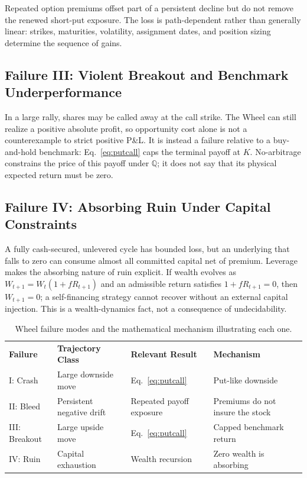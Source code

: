\documentclass[aps,pra,reprint,superscriptaddress,amsmath,amssymb,floatfix]{revtex4-2}
\theoremstyle{plain}
\theoremstyle{definition}
\theoremstyle{remark}
\begin{document}
Repeated option premiums offset part of a persistent decline but do not remove
the renewed short-put exposure. The loss is path-dependent rather than
generally linear: strikes, maturities, volatility, assignment dates, and
position sizing determine the sequence of gains.

\subsection{Failure III: Violent Breakout and Benchmark Underperformance}

In a large rally, shares may be called away at the call strike. The Wheel can
still realize a positive absolute profit, so opportunity cost alone is not a
counterexample to strict positive P\&L. It is instead a failure relative to a
buy-and-hold benchmark: Eq.~\eqref{eq:putcall} caps the terminal payoff at
\(K\). No-arbitrage constrains the price of this payoff under
\(\mathbb{Q}\); it does not say that its physical expected return must be zero.

\subsection{Failure IV: Absorbing Ruin Under Capital Constraints}

A fully cash-secured, unlevered cycle has bounded loss, but an underlying that
falls to zero can consume almost all committed capital net of premium.
Leverage makes the absorbing nature of ruin explicit. If wealth evolves as
\(W_{t+1}=W_t(1+fR_{t+1})\) and an admissible return satisfies
\(1+fR_{t+1}=0\), then \(W_{t+1}=0\); a self-financing strategy cannot recover
without an external capital injection. This is a wealth-dynamics fact, not a
consequence of undecidability.

\begin{table}[ht]
\caption{\label{tab:failuremodes}Wheel failure modes and the mathematical mechanism illustrating each one.}
\begin{ruledtabular}
\begin{tabular*}{\textwidth}{@{\extracolsep{\fill}}llll}
\textbf{Failure} & \textbf{Trajectory Class} & \textbf{Relevant Result} & \textbf{Mechanism} \\
\colrule
I: Crash & Large downside move & Eq.~\eqref{eq:putcall} & Put-like downside \\
II: Bleed & Persistent negative drift & Repeated payoff exposure & Premiums do not insure the stock \\
III: Breakout & Large upside move & Eq.~\eqref{eq:putcall} & Capped benchmark return \\
IV: Ruin & Capital exhaustion & Wealth recursion & Zero wealth is absorbing \\
\end{tabular*}
\end{ruledtabular}
\end{table}
\end{document}
